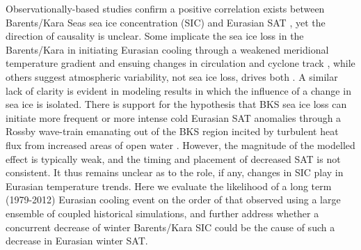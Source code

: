 \documentclass{nature}
\begin{document}


Observationally-based studies confirm a positive correlation exists between Barents/Kara Seas sea ice concentration (SIC) and Eurasian SAT \cite{inoue12,outten12,sorokina15}, yet the direction of causality is unclear. Some implicate the sea ice loss in the Barents/Kara in initiating Eurasian cooling through a weakened meridional temperature gradient and ensuing changes in circulation and cyclone track \cite{inoue12,outten12}, while others suggest atmospheric variability, not sea ice loss, drives both \cite{sorokina15}. A similar lack of clarity is evident in modeling results in which the influence of a change in sea ice is isolated. There is support for the hypothesis that BKS sea ice loss can initiate more frequent or more intense cold Eurasian SAT anomalies through a Rossby wave-train emanating out of the BKS region incited by turbulent heat flux from increased areas of open water \cite{honda09,petoukhov10,mori14,kim14,peings14,gerber14}. However, the magnitude of the modelled effect is typically weak, and the timing and placement of decreased SAT is not consistent. It thus remains unclear as to the role, if any, changes in SIC play in Eurasian temperature trends. Here we evaluate the likelihood of a long term (1979-2012) Eurasian cooling event on the order of that observed using a large ensemble of coupled historical simulations, and further address whether a concurrent decrease of winter Barents/Kara SIC could be the cause of such a decrease in Eurasian winter SAT. %
\end{document}

